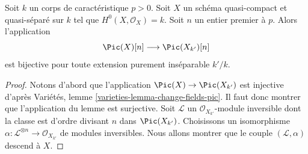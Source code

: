 \begin{lemma}
\label{lemma-torsion-descends}
Soit $k$ un corps de caractéristique $p > 0$. Soit $X$ un
schéma quasi-compact et quasi-séparé sur $k$ tel que
$H^0(X, \mathcal{O}_X) = k$. Soit $n$ un entier premier à $p$.
Alors l'application
$$
\Pic(X)[n] \longrightarrow \Pic(X_{k'})[n]
$$
est bijective pour toute extension purement inséparable $k'/k$.
\end{lemma}

\begin{proof}
Notons d'abord que l'application $\Pic(X) \to \Pic(X_{k'})$
est injective d'après Variétés, lemme \ref{varieties-lemma-change-fields-pic}.
Il faut donc montrer que l'application du lemme est surjective.
Soit $\mathcal{L}$ un $\mathcal{O}_{X_{k'}}$-module inversible
dont la classe est d'ordre divisant $n$ dans $\Pic(X_{k'})$.
Choisissons un isomorphisme
$\alpha : \mathcal{L}^{\otimes n} \to \mathcal{O}_{X_{k'}}$
de modules inversibles.
Nous allons montrer que le couple $(\mathcal{L}, \alpha)$ descend
à $X$.


\end{proof}

